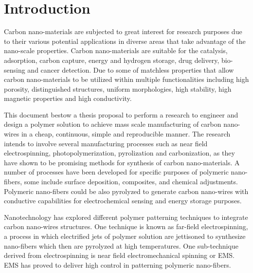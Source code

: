 
\chapter{Introduction} %

\label{Chapter:Introduction}

Carbon nano-materials are subjected to great interest for research purposes due to their various potential applications in diverse areas that take advantage of the nano-scale properties. Carbon nano-materials are suitable for the catalysis, adsorption, carbon capture, energy and hydrogen storage, drug delivery, bio-sensing and cancer detection. \cite{Siddiqui2019} Due to some of matchless properties that allow carbon nano-materials to be utilized within multiple functionalities including high porosity, distinguished structures, uniform morphologies, high stability, high magnetic properties and high conductivity. \cite{Siddiqui2019}


This document bestow a thesis proposal to perform a research to engineer and design a polymer solution to achieve mass scale manufacturing of carbon nano-wires in a cheap, continuous, simple and reproducible manner. The research intends to involve several manufacturing processes such as near field electrospinning, photopolymerization, pyrolization and carbonization, as they have shown to be promising methods for synthesis of carbon nano-materials. \cite{Cardenas2017} A number of processes have been developed for specific purposes of polymeric nano-fibers, some include surface deposition, composites, and chemical adjustments. Polymeric nano-fibers could be also pyrolyzed to generate carbon nano-wires with conductive capabilities \cite{Madou2011} for electrochemical sensing and energy storage purposes.

Nanotechnology has explored different polymer patterning techniques to integrate carbon nano-wires structures. One technique is known as far-field electrospinning, a process in which electrified jets of polymer solution are jettisoned to synthesize nano-fibers which then are pyrolyzed at high temperatures. One sub-technique derived from electrospinning is near field electromechanical spinning or EMS. EMS has proved to deliver high control in patterning polymeric nano-fibers. \cite{Cardenas2017}

